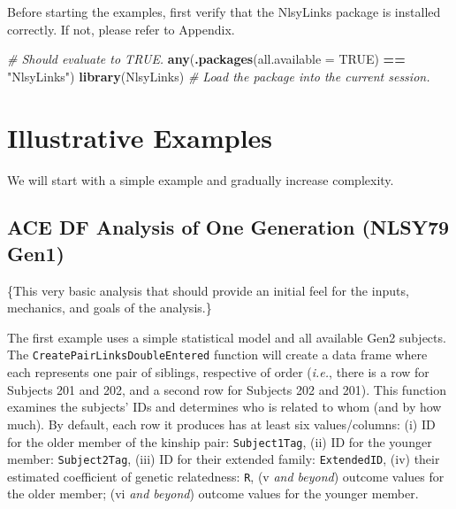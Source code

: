 \documentclass[smallextended]{svjour3}       %
\newenvironment{Shaded}{\begin{snugshade}}{\end{snugshade}}
\newcommand{\CommentTok}[1]{\textcolor[rgb]{0.56,0.35,0.01}{\textit{#1}}}
\newcommand{\DataTypeTok}[1]{\textcolor[rgb]{0.13,0.29,0.53}{#1}}
\newcommand{\KeywordTok}[1]{\textcolor[rgb]{0.13,0.29,0.53}{\textbf{#1}}}
\newcommand{\NormalTok}[1]{#1}
\newcommand{\OperatorTok}[1]{\textcolor[rgb]{0.81,0.36,0.00}{\textbf{#1}}}
\newcommand{\OtherTok}[1]{\textcolor[rgb]{0.56,0.35,0.01}{#1}}
\newcommand{\StringTok}[1]{\textcolor[rgb]{0.31,0.60,0.02}{#1}}
\begin{document}
Before starting the examples, first verify that the NlsyLinks package is
installed correctly. If not, please refer to Appendix.

\begin{Shaded}
\begin{Highlighting}[]
\CommentTok{# Should evaluate to TRUE.}
\KeywordTok{any}\NormalTok{(}\KeywordTok{.packages}\NormalTok{(}\DataTypeTok{all.available =} \OtherTok{TRUE}\NormalTok{) }\OperatorTok{==}\StringTok{ "NlsyLinks"}\NormalTok{)}
\KeywordTok{library}\NormalTok{(NlsyLinks) }\CommentTok{# Load the package into the current session.}
\end{Highlighting}
\end{Shaded}

\hypertarget{illustrative-examples}{%
\section{Illustrative Examples}\label{illustrative-examples}}

We will start with a simple example and gradually increase complexity.

\hypertarget{ace-df-analysis-of-one-generation-nlsy79-gen1}{%
\subsection{ACE DF Analysis of One Generation (NLSY79
Gen1)}\label{ace-df-analysis-of-one-generation-nlsy79-gen1}}

\{This very basic analysis that should provide an initial feel for the
inputs, mechanics, and goals of the analysis.\}

The first example uses a simple statistical model and all available Gen2
subjects. The \texttt{CreatePairLinksDoubleEntered} function will create
a data frame where each represents one pair of siblings, respective of
order (\emph{i.e.}, there is a row for Subjects 201 and 202, and a
second row for Subjects 202 and 201). This function examines the
subjects' IDs and determines who is related to whom (and by how much).
By default, each row it produces has at least six values/columns: (i) ID
for the older member of the kinship pair: \texttt{Subject1Tag}, (ii) ID
for the younger member: \texttt{Subject2Tag}, (iii) ID for their
extended family: \texttt{ExtendedID}, (iv) their estimated coefficient
of genetic relatedness: \texttt{R}, (v \emph{and beyond}) outcome values
for the older member; (vi \emph{and beyond}) outcome values for the
younger member.
\end{document}
